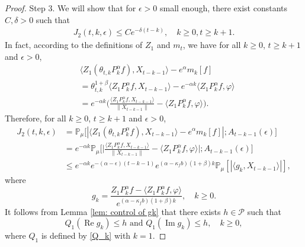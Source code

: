 \documentclass[12pt,a4paper]{amsart}
\theoremstyle{plain}
\theoremstyle{definition}
\numberwithin{equation}{section}
\begin{document}
\begin{proof}
    Step 3.
    We will show that for $\epsilon>0$ small enough, there exist constants $C, \delta>0$ such that
    \begin{equation}\begin{split}
    \label{eq:31step3}
      J_2(t,k,\epsilon)
      \leq Ce^{-\delta (t-k)},
      \quad k\geq 0, t\geq k+1.
    \end{split}\end{equation}
    In fact, according to the definitions of $Z_1$ and $m_t$, we have for all $k\geq 0$, $t\geq k+1$ and $\epsilon> 0$,
    \begin{equation}\begin{split}
          &\langle Z_1(\theta_{t,k}P^\alpha_k f),X_{t-k-1}\rangle-e^{\alpha}m_k[f]
          \\&= \theta_{t,k}^{1+\beta} \langle Z_1P^\alpha_k f,X_{t-k-1}\rangle - e^{-\alpha k}\langle  Z_1P^\alpha_k f,\varphi\rangle
          \\&=e^{-\alpha k}\Big(\frac{\langle Z_1P^\alpha_k f ,X_{t-k-1}\rangle}{\|X_{t-k-1}\|}-\langle  Z_1P^\alpha_k f ,\varphi\rangle\Big).
    \end{split}\end{equation}
Therefore, for all $k\geq 0$, $t\geq k+1$ and $\epsilon> 0$,
\begin{equation}\begin{split}
\label{eq: prevJ2}
J_2(t,k,\epsilon)&
    = \mathbb P_\mu\big[|\langle Z_1(\theta_{t,k}P^\alpha_k f),X_{t-k-1}\rangle-e^{\alpha}m_k[f]|;A_{t-k-1}(\epsilon)\big]
    \\&=e^{-\alpha k}\mathbb{P}_{\mu}\bigg[\Big|\frac{\langle Z_1P^{\alpha}_k f,X_{t-k-1}\rangle}{\|X_{t-k-1}\|}-\langle  Z_1P^{\alpha}_k f,\varphi\rangle\Big|;A_{t-k-1}(\epsilon)\bigg]\nonumber\\
    &\leq e^{-\alpha k}e^{-(\alpha-\epsilon)(t-k-1)}e^{(\alpha-\kappa_f b)(1+\beta)k} \mathbb{P}_{\mu}\left[\left|\langle g_k,X_{t-k-1}\rangle\right|\right],
\end{split}\end{equation}
where
\[
g_k
    = \frac{Z_1 P^{\alpha}_k f-\langle  Z_1P^{\alpha}_k f,\varphi\rangle}{e^{(\alpha-\kappa_f b)(1+\beta)k}},
    \quad k \geq 0.
\]
It follows from Lemma \ref{lem: control of gk} that there exists $h\in \mathcal{P}$ such that
 \[
    Q_1 (\operatorname{Re} g_k) \leq h
    \text{ and } Q_1 (\operatorname{Im} g_k)\leq h,
    \quad k \geq 0,
 \]
    where $Q_1$ is defined by \eqref{Q_k} with $k=1$.


\end{proof}
\end{document}
